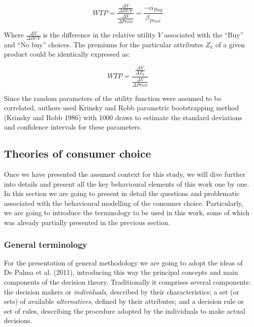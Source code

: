 \documentclass[12pt,]{article}
\begin{document}
\begin{equation}
WTP = \frac{
 \frac{\Delta V}{\Delta BUY}
}{
 \frac{\Delta V}{\Delta Price}
} = \frac{
  - \alpha_{Buy}
}{
  \beta_{Price}
}
\end{equation}

Where \(\frac{\Delta V}{\Delta BUY}\) is the difference in the relative
utility \(V\) associated with the ``Buy'' and ``No buy'' choices. The
premiums for the particular attributes \(Z_k\) of a given product could
be identically expressed as:

\begin{equation}
WTP = \frac{
 \frac{\Delta V}{\Delta Z_k}
}{
 \frac{\Delta V}{\Delta Price}
}
\end{equation}

Since the random parameters of the utility function were assumed to be
correlated, authors used Krinsky and Robb parametric bootstrapping
method (Krinsky and Robb 1986) with 1000 draws to estimate the standard
deviations and confidence intervals for these parameters.

\hypertarget{theories-of-consumer-choice}{%
\subsection{Theories of consumer
choice}\label{theories-of-consumer-choice}}

Once we have presented the assumed context for this study, we will dive
further into details and present all the key behavioural elements of
this work one by one. In this section we are going to present in detail
the questions and problematic associated with the behavioural modelling
of the consumer choice. Particularly, we are going to introduce the
terminology to be used in this work, some of which was already partially
presented in the previous section.

\hypertarget{general-terminology}{%
\subsubsection{General terminology}\label{general-terminology}}

For the presentation of general methodology we are going to adopt the
ideas of De Palma et al. (2011), introducing this way the principal
concepts and main components of the decision theory. Traditionally it
comprises several components: the decision makers or \emph{individuals},
described by their characteristics; a set (or sets) of available
\emph{alternatives}, defined by their attributes; and a decision rule or
set of rules, describing the procedure adopted by the individuals to
make actual decisions.
\end{document}
